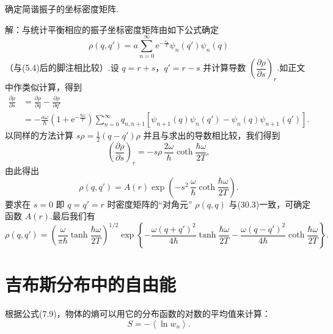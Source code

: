 \begin{xiti}

\quad 确定简谐振子的坐标密度矩阵.

解：与统计平衡相应的振子坐标密度矩阵由如下公式确定
\begin{equation*}
  \rho(q,q')=a\sum_{n=0}^{\infty}\mathrm{e}^{-\frac{\varepsilon_n}{T}}\psi_n(q')\psi_n(q)
\end{equation*}
（与(5.4)后的脚注相比较）.设 $q=r+s$，$q'=r-s$ 并计算导数 $\left(\dfrac{\partial\rho}{\partial s}\right)_r$.如正文中作类似计算，得到
\begin{equation*}
\begin{aligned}
  \frac{\partial\rho}{\partial s}
  &=\frac{\partial\rho}{\partial q}-\frac{\partial\rho}{\partial q'}\\
  &=-\frac{a\omega}{\hbar}\left(1+\mathrm{e}^{-\frac{\hbar\omega}{T}}\right)
  \sum_{n=0}^{\infty}q_{n,n+1}\left[\psi_{n+1}(q)\psi_n(q')-\psi_n(q)\psi_{n+1}(q')\right].
\end{aligned}
\end{equation*}
以同样的方法计算 $s\rho=\frac{1}{2}(q-q')\rho$ 并且与求出的导数相比较，我们得到
\begin{equation*}
  \left(\frac{\partial\rho}{\partial s}\right)_r
  =-s\rho\,\frac{2\omega}{\hbar}\coth\frac{\hbar\omega}{2T},
\end{equation*}
由此得出
\begin{equation*}
  \rho(q,q')=A(r)\exp\left(-s^2\,\frac{\omega}{\hbar}\coth\frac{\hbar\omega}{2T}\right).
\end{equation*}
要求在 $s=0$ 即 $q=q'=r$ 时密度矩阵的“对角元” $\rho(q,q)$ 与(30.3)一致，可确定函数 $A(r)$.最后我们有
\begin{equation*}
  \rho(q,q')=\left(\frac{\omega}{\pi\hbar}\tanh\frac{\hbar\omega}{2T}\right)^{1/2}
  \exp\left\{-\frac{\omega\left(q+q'\right)^2}{4\hbar}\tanh\frac{\hbar\omega}{2T}
  -\frac{\omega\left(q-q'\right)^2}{4\hbar}\coth\frac{\hbar\omega}{2T}\right\}.
\end{equation*}

\end{xiti}

\section{吉布斯分布中的自由能}

根据公式(7.9)，物体的熵可以用它的分布函数的对数的平均值来计算：
\begin{equation*}
  S=-\left\langle\ln w_n\right\rangle.
\end{equation*}

